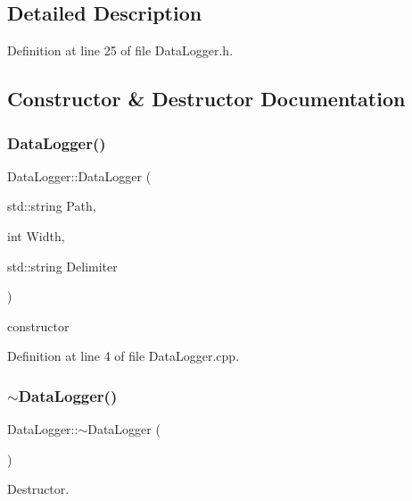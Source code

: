 \subsection{Detailed Description}


Definition at line 25 of file Data\+Logger.\+h.



\subsection{Constructor \& Destructor Documentation}
\mbox{\label{class_data_logger_a3ea159d4b0a7434f9806f9fdde296513}} 
\subsubsection{\texorpdfstring{Data\+Logger()}{DataLogger()}}
{\footnotesize\ttfamily Data\+Logger\+::\+Data\+Logger (\begin{DoxyParamCaption}\item[{std\+::string}]{Path,  }\item[{int}]{Width,  }\item[{std\+::string}]{Delimiter }\end{DoxyParamCaption})}



constructor 



Definition at line 4 of file Data\+Logger.\+cpp.

\mbox{\label{class_data_logger_a9aaff109f3e7749a0a0a0313655da50a}} 
\subsubsection{\texorpdfstring{$\sim$\+Data\+Logger()}{~DataLogger()}}
{\footnotesize\ttfamily Data\+Logger\+::$\sim$\+Data\+Logger (\begin{DoxyParamCaption}{ }\end{DoxyParamCaption})}



Destructor. 



